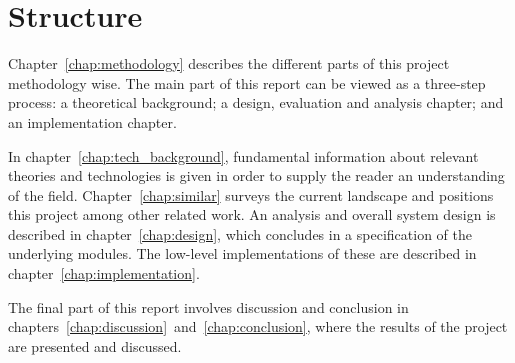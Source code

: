 \section{Structure}
  \label{sec:structure}

Chapter~\ref{chap:methodology} describes the different parts of this project methodology wise. The main part of this report can be viewed as a three-step process: a theoretical background; a design, evaluation and analysis chapter; and an implementation chapter.

In chapter~\ref{chap:tech_background}, fundamental information about relevant theories and technologies is given in order to supply the reader an understanding of the field. Chapter~\ref{chap:similar} surveys the current landscape and positions this project among other related work. An analysis and overall system design is described in chapter~\ref{chap:design}, which concludes in a specification of the underlying modules. The low-level implementations of these are described in chapter~\ref{chap:implementation}.

The final part of this report involves discussion and conclusion in chapters~\ref{chap:discussion}~and~\ref{chap:conclusion}, where the results of the project are presented and discussed.
